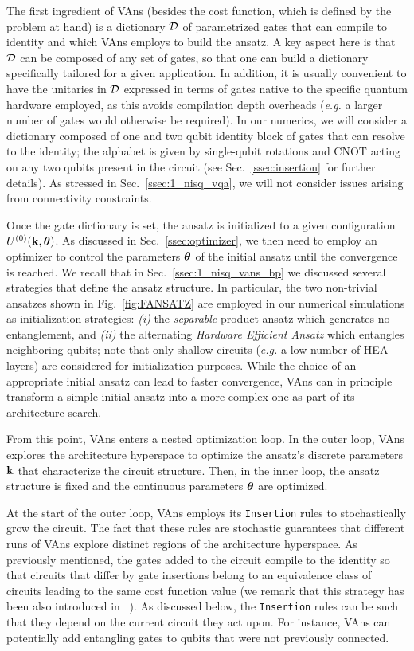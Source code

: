 The first ingredient of VAns (besides the cost function, which is defined by the problem at hand) is a dictionary $\mathcal{D}$ of parametrized gates that can compile to identity and which VAns employs to build the ansatz. A key aspect here is that $\mathcal{D}$ can be composed of any set of gates, so that one can build a dictionary specifically tailored for a given application. In addition, it is usually convenient to have the unitaries in $\mathcal{D}$ expressed in terms of gates native to the specific quantum hardware employed, as this avoids compilation depth overheads (\textit{e.g.} a larger number of gates would otherwise be required). In our numerics, we will consider a dictionary composed of one and two qubit identity block of gates that can resolve to the identity; the alphabet is given by single-qubit rotations and CNOT acting on any two qubits present in the circuit (see Sec.~\ref{ssec:insertion} for further details). As stressed in Sec.~\ref{ssec:1_nisq_vqa}, we will not consider issues arising from connectivity constraints.

Once the gate dictionary is set, the ansatz is initialized to a given configuration $U^{(0)}(\mathbf{k},\bm{\theta})$. As discussed in Sec.~\ref{ssec:optimizer}, we then need to employ an optimizer to control the parameters $\bm{\theta}$ of the initial ansatz until the convergence is reached. We recall that in Sec.~\ref{ssec:1_nisq_vans_bp} we discussed several strategies that define the ansatz structure. In particular, the two non-trivial ansatzes shown in Fig.~\ref{fig:FANSATZ} are employed in our numerical simulations as initialization strategies: \textit{(i)} the \textit{separable} product ansatz which generates no entanglement, and \textit{(ii)} the alternating \textit{Hardware Efficient Ansatz}
which entangles neighboring qubits; note that only shallow circuits (\textit{e.g.} a low number of HEA-layers) are considered for initialization purposes. While the choice of an appropriate initial ansatz can lead to faster convergence, VAns can in principle transform a simple initial ansatz into a more complex one as part of its architecture search.

From this point, VAns enters a nested optimization loop. In the outer loop, VAns explores the architecture hyperspace to optimize the ansatz's discrete parameters $\mathbf{k}$ that characterize the circuit structure. Then, in the inner loop, the ansatz structure is fixed and the continuous parameters $\bm{\theta}$ are optimized.

At the start of the outer loop, VAns employs its \texttt{Insertion} rules to stochastically grow the circuit. The fact that these rules are stochastic guarantees that different runs of VAns explore distinct regions of the architecture hyperspace. As previously mentioned, the gates added to the circuit compile to the identity so that circuits that differ by gate insertions belong to an equivalence class of circuits leading to the same cost function value (we remark that this strategy has been also introduced in ~\cite{rattew2019domain}). As discussed below, the \texttt{Insertion} rules can be such that they depend on the current circuit they act upon. For instance, VAns can potentially add entangling gates to qubits that were not previously connected.

